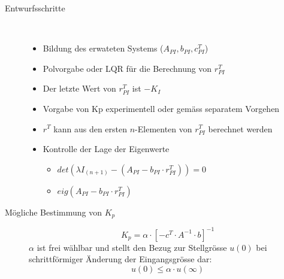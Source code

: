 \begin{description}
	\item[Entwurfsschritte]~\par
	\begin{itemize}
		\item Bildung des erwateten Systems ($ A_{PI}, b_{PI}, c^T_{PI} $)
		\item Polvorgabe oder LQR für die Berechnung von $ r^T_{PI} $ 
		\item Der letzte Wert von $r^T_{PI} $ ist $-K_I$
		\item Vorgabe von Kp experimentell oder gemäss separatem Vorgehen
		\item $r^T$ kann aus den ersten $n$-Elementen von $r^T_{PI} $ berechnet werden
		\item Kontrolle der Lage der Eigenwerte
		\begin{itemize}
			\item $det(\lambda I_{(n+1)}-(A_{PI}-b_{PI}\cdot r^T_{PI}))=0 $
			\item $eig(A_{PI}-b_{PI}\cdot r^T_{PI})	$
		\end{itemize} 	
	\end{itemize}
\end{description}

\begin{description}
	\item [Mögliche Bestimmung von $K_p$]
	\[
		K_p=\alpha \cdot [-c^T\cdot A^{-1}\cdot b]^{-1}
	\]
	$\alpha $ ist frei wählbar und stellt den Bezug zur Stellgrösse $ u(0) $ bei schrittförmiger Änderung der Eingangsgrösse dar: 
	\[ u(0)\leqslant \alpha\cdot u(\infty)
	\]
\end{description}